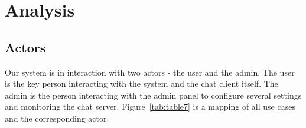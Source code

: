 \chapter{Analysis}\label{ch:analysis}


\section{Actors}\label{sec:actors}

Our system is in interaction with two actors - the user and the admin.
The user is the key person interacting with the system and the chat client itself.
The admin is the person interacting with the admin panel to configure several settings and monitoring the chat server.
Figure~\ref{tab:table7} is a mapping of all use cases and the corresponding actor.

